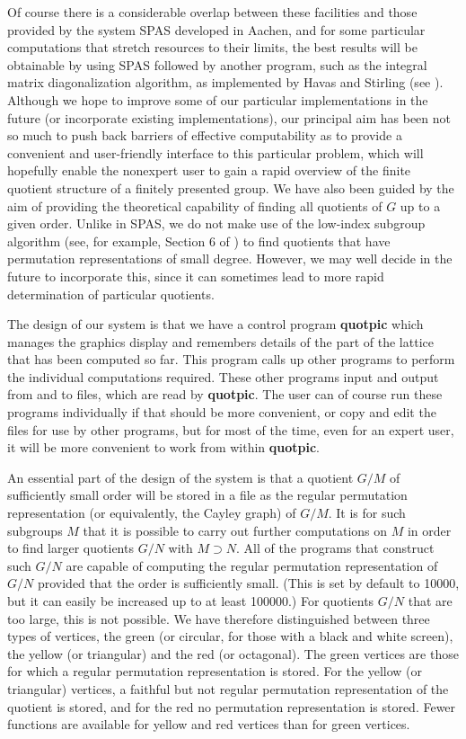 Of course there is a considerable overlap between these facilities and those
provided by the system SPAS developed in Aachen, and for some particular
computations that stretch resources to their limits, the best results will
be obtainable by using SPAS followed by another program, such as the integral
matrix diagonalization algorithm, as implemented by Havas and Stirling
(see \cite{4}).
Although we hope to improve some of our particular implementations in the
future (or incorporate existing implementations), our principal aim has been
not so much to push back barriers of effective computability as to provide
a convenient and user-friendly interface to this particular problem, which
will hopefully enable the nonexpert user to gain a rapid overview of the
finite quotient structure of a finitely presented group.
We have also been guided by the aim of providing the theoretical
capability of finding all quotients of $G$ up to a given order. Unlike
in SPAS, we do not make use of the low-index subgroup algorithm (see, for
example, Section 6 of \cite{9}) to find quotients that have permutation
representations of small degree. However, we may well decide in the future
to incorporate this, since it can sometimes lead to more rapid determination
of particular quotients.

The design of our system is that
we have a control program {\bf quotpic} which manages the graphics display
and remembers details of the part of the lattice that has been computed so far.
This program calls up other programs to perform the individual computations
required. These other programs input and output from and to files, which are
read by {\bf quotpic}. The user can of course run these programs
individually if that should be more convenient, or copy and edit the files
for use by other programs, but for most of the time, even for an expert user,
it will be more convenient to work from within {\bf quotpic}.

An essential part of the design of the system
is that a quotient $G/M$ of sufficiently small order will be stored in a file
as the regular permutation representation (or equivalently, the Cayley graph) of
$G/M$. It is for such subgroups $M$ that it is possible to carry out further
computations on $M$ in order to find larger quotients $G/N$ with $M \supset N$.
All of the programs that construct such $G/N$ are capable of computing the
regular permutation representation of $G/N$ provided that the order is
sufficiently small. (This is  set by default to 10000, but it can easily be
increased up to at least 100000.) For quotients $G/N$ that are too large,
this is not possible. We have therefore distinguished between three types
of vertices, the green (or circular, for those with a black and white screen),
the yellow (or triangular) and the red (or octagonal). 
The green vertices are those for which a regular
permutation representation is stored. For the yellow (or triangular) vertices,
a faithful but not regular permutation representation of the quotient is stored,
and for the red no permutation representation is stored. Fewer functions
are available for yellow and red vertices than for green vertices.

